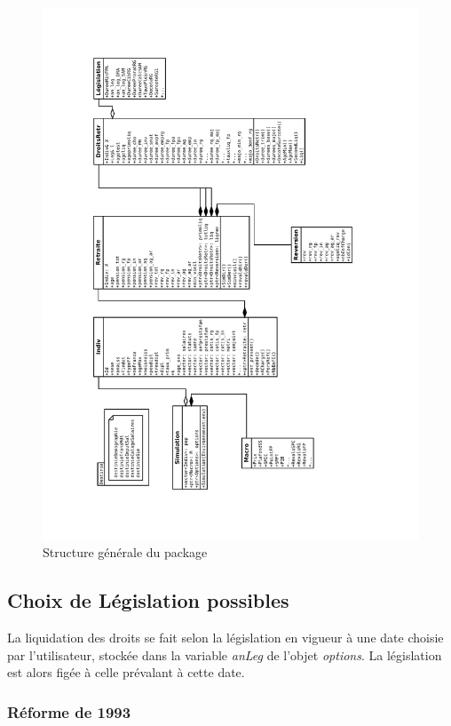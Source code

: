 \begin{landscape}
\begin{figure}
\caption{Structure générale du package}
\label{fig:structGenePack}
\includegraphics[scale=0.85,angle=270,origin=c]{Diagramme2.pdf}
\end{figure}
\end{landscape}


\subsection{Choix de Législation possibles}
La liquidation des droits se fait selon la législation en vigueur à une date choisie par l'utilisateur, stockée dans la variable \textit{anLeg} de l'objet \textit{options}. La législation est alors figée à celle prévalant à cette date.

\subsubsection{Réforme de 1993}

